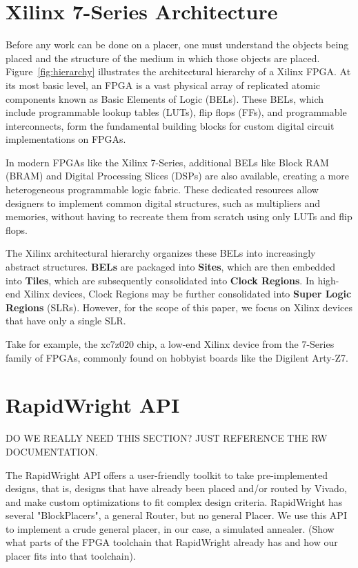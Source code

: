 \documentclass[twocolumn]{article}
\begin{document}
\section{Xilinx 7-Series Architecture}
    Before any work can be done on a placer, one must understand the objects being placed and the structure of the medium in which those objects are placed. 
    Figure~\ref{fig:hierarchy} illustrates the architectural hierarchy of a Xilinx FPGA. 
    At its most basic level, an FPGA is a vast physical array of replicated atomic components known as Basic Elements of Logic (BELs).
    These BELs, which include programmable lookup tables (LUTs), flip flops (FFs), and programmable interconnects, form the fundamental building blocks for custom digital circuit implementations on FPGAs.

    In modern FPGAs like the Xilinx 7-Series, additional BELs like Block RAM (BRAM) and Digital Processing Slices (DSPs) are also available, creating a more heterogeneous programmable logic fabric. 
    These dedicated resources allow designers to implement common digital structures, such as multipliers and memories, without having to recreate them from scratch using only LUTs and flip flops.

    The Xilinx architectural hierarchy organizes these BELs into increasingly abstract structures. 
    \textbf{BELs} are packaged into \textbf{Sites}, which are then embedded into \textbf{Tiles}, which are subsequently consolidated into \textbf{Clock Regions}. 
    In high-end Xilinx devices, Clock Regions may be further consolidated into \textbf{Super Logic Regions} (SLRs). 
    However, for the scope of this paper, we focus on Xilinx devices that have only a single SLR.

    Take for example, the xc7z020 chip, a low-end Xilinx device from the 7-Series family of FPGAs, commonly found on hobbyist boards like the Digilent Arty-Z7.


\section{RapidWright API}

    DO WE REALLY NEED THIS SECTION? JUST REFERENCE THE RW DOCUMENTATION.

    The RapidWright API offers a user-friendly toolkit to take pre-implemented designs, that is, designs that have already been placed and/or routed by Vivado, and make custom optimizations to fit complex design criteria. 
    RapidWright has several "BlockPlacers", a general Router, but no general Placer. 
    We use this API to implement a crude general placer, in our case, a simulated annealer. 
    (Show what parts of the FPGA toolchain that RapidWright already has and how our placer fits into that toolchain). 
\end{document}

